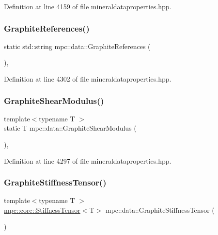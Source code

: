 Definition at line 4159 of file mineraldataproperties.\+hpp.

\mbox{\label{namespacempc_1_1data_a44eb9375e7b636aa2f7aa6e5d5bc16c1}} 
\subsubsection{\texorpdfstring{Graphite\+References()}{GraphiteReferences()}}
{\footnotesize\ttfamily static std\+::string mpc\+::data\+::\+Graphite\+References (\begin{DoxyParamCaption}{ }\end{DoxyParamCaption})\hspace{0.3cm}{\ttfamily [inline]}, {\ttfamily [static]}}



Definition at line 4302 of file mineraldataproperties.\+hpp.

\mbox{\label{namespacempc_1_1data_ab32f0b0209b9e16fd06431929a2721b0}} 
\subsubsection{\texorpdfstring{Graphite\+Shear\+Modulus()}{GraphiteShearModulus()}}
{\footnotesize\ttfamily template$<$typename T $>$ \\
static T mpc\+::data\+::\+Graphite\+Shear\+Modulus (\begin{DoxyParamCaption}{ }\end{DoxyParamCaption})\hspace{0.3cm}{\ttfamily [inline]}, {\ttfamily [static]}}



Definition at line 4297 of file mineraldataproperties.\+hpp.

\mbox{\label{namespacempc_1_1data_ab0e3c156b9cf414c6206cf48120790a6}} 
\subsubsection{\texorpdfstring{Graphite\+Stiffness\+Tensor()}{GraphiteStiffnessTensor()}}
{\footnotesize\ttfamily template$<$typename T $>$ \\
\mbox{\hyperlink{structmpc_1_1core_1_1_stiffness_tensor}{mpc\+::core\+::\+Stiffness\+Tensor}}$<$T$>$ mpc\+::data\+::\+Graphite\+Stiffness\+Tensor (\begin{DoxyParamCaption}{ }\end{DoxyParamCaption})}



